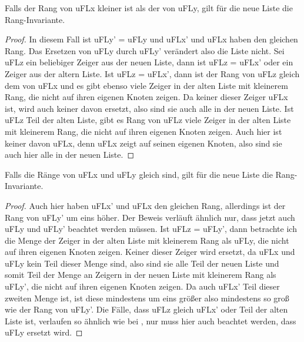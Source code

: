 \begin{lemma}[\KruskalupdateunionFindrankInvariant]
  Falls der Rang von uFLx kleiner ist als der von uFLy, gilt für die neue Liste die Rang-Invariante.
\end{lemma}
\begin{proof}
  In diesem Fall ist uFLy' = uFLy und uFLx' und uFLx haben den gleichen Rang.
  Das Ersetzen von uFLy durch uFLy' verändert also die Liste nicht.
  Sei uFLz ein beliebiger Zeiger aus der neuen Liste, dann ist uFLz = uFLx' oder ein Zeiger aus der altern Liste.
  Ist uFLz = uFLx', dann ist der Rang von uFLz gleich dem von uFLx und es gibt ebenso viele Zeiger in der alten Liste mit kleinerem Rang,
  die nicht auf ihren eigenen Knoten zeigen.
  Da keiner dieser Zeiger uFLx ist, wird auch keiner davon ersetzt, also sind sie auch alle in der neuen Liste.
  Ist uFLz Teil der alten Liste, gibt es Rang von uFLz viele Zeiger in der alten Liste mit kleinerem Rang, die nicht auf ihren eigenen Knoten zeigen.
  Auch hier ist keiner davon uFLx, denn uFLx zeigt auf seinen eigenen Knoten, also sind sie auch hier alle in der neuen Liste.
\end{proof}

\begin{lemma}[\KruskalupdateunionFindrankInvariantofrankeq]
  Falls die Ränge von uFLx und uFLy gleich sind, gilt für die neue Liste die Rang-Invariante.
\end{lemma}
\begin{proof}
  Auch hier haben uFLx' und uFLx den gleichen Rang, allerdings ist der Rang von uFLy' um eins höher.
  Der Beweis verläuft ähnlich nur, dass jetzt auch uFLy und uFLy' beachtet werden müssen.
  Ist uFLz = uFLy', dann betrachte ich die Menge der Zeiger in der alten Liste mit kleinerem Rang als uFLy, die nicht auf ihren eigenen Knoten zeigen.
  Keiner dieser Zeiger wird ersetzt, da uFLx und uFLy kein Teil dieser Menge sind,
  also sind sie alle Teil der neuen Liste und somit Teil der Menge an Zeigern in der neuen Liste mit kleinerem Rang als uFLy', die nicht auf ihren eigenen Knoten zeigen.
  Da auch uFLx' Teil dieser zweiten Menge ist, ist diese mindestens um eins größer also mindestens so groß wie der Rang von uFLy'.
  Die Fälle, dass uFLz gleich uFLx' oder Teil der alten Liste ist, verlaufen so ähnlich wie bei \KruskalupdateunionFindrankInvariant,
  nur muss hier auch beachtet werden, dass uFLy ersetzt wird.
\end{proof}



